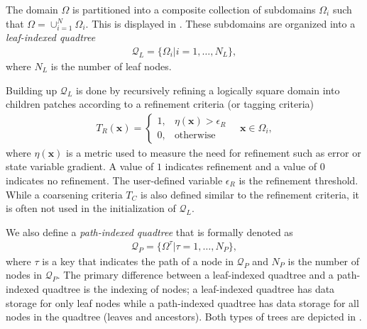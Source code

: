 The domain $\Omega$ is partitioned into a composite collection of subdomains $\Omega_i$ such that $\Omega = \cup_{i = 1}^{N} \Omega_i$. This is displayed in . These subdomains are organized into a {\em leaf-indexed quadtree}
\begin{align}
    \mathcal{Q}_L = \{\Omega_i | i = 1, \dots, N_L\},
    \label{eq:leaf-indexed-quadtree}
\end{align}
where $N_L$ is the number of leaf nodes.  Building up $\mathcal{Q}_L$ is done by recursively refining a logically square domain into children patches according to a refinement criteria (or tagging criteria)
\begin{align}
    T_{R} (\textbf{x}) =
    \begin{cases}
        1,& \eta(\textbf{x}) > \epsilon_{R} \\
        0,& \text{otherwise}
    \end{cases}
    \quad \textbf{x} \in \Omega_i,
\end{align}
where $\eta(\textbf{x})$ is a metric used to measure the need for refinement such as error or state variable gradient. A value of $1$ indicates refinement and a value of $0$ indicates no refinement. The user-defined variable $\epsilon_{R}$ is the refinement threshold. While a coarsening criteria $T_{C}$ is also defined similar to the refinement criteria, it is often not used in the initialization of $\mathcal{Q}_L$.

We also define a {\em path-indexed quadtree} that is formally denoted as
\begin{align}
    \mathcal{Q}_P = \{\Omega^{\tau} | \tau = 1, \dots, N_P\},
    \label{eq:path-indexed-quadtree}
\end{align}
where $\tau$ is a key that indicates the path of a node in $\mathcal{Q}_P$ and $N_P$ is the number of nodes in $\mathcal{Q}_P$. The primary difference between a leaf-indexed quadtree and a path-indexed quadtree is the indexing of nodes; a leaf-indexed quadtree has data storage for only leaf nodes while a path-indexed quadtree has data storage for all nodes in the quadtree (leaves and ancestors). Both types of trees are depicted in .

